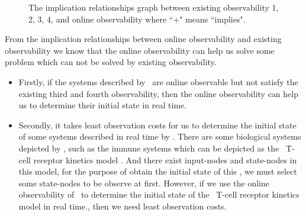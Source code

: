 \begin{figure}[thpb]
      \centering
      
      \caption{The implication relationships graph between existing observability 1, 2, 3, 4, and online observability where ``+" means ``implies".}
      \label{fig:7}
   \end{figure}

From the implication relationships between online observability and existing observability we know that the online observability can help us solve some problem which can not be solved by existing observability. 
 \begin{itemize}
 \item Firstly, if the systems described by \BCNs\ are online observable but not satisfy the existing third and fourth observability, then the online observability can help us to determine their initial state in real time. 
 \item Secondly, it takes least observation costs for us to determine the initial state of some systems described in real time by \BCNs. There are some biological systems depicted by \BCNs, such as the immune systems which can be depicted as the \BCN\ T-cell receptor kinetics model \cite{Klamt2006A}. And there exist input-nodes and state-nodes in this model, for the purpose of obtain the initial state of this \BCN, we must select some state-nodes to be observe at first. However, if we use the online observability of \BCNs\ to determine the initial state of the \BCN\ T-cell receptor kinetics model in real time., then we need least observation costs. 
 \end{itemize}

